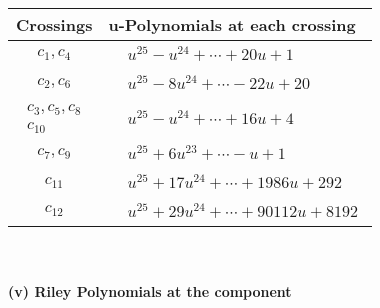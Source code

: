 \documentclass[1p]{elsarticle_modified}
\theoremstyle{definition}
\begin{document}
\begin{tabular}{m{50pt}|m{274pt}}
Crossings & \hspace{64pt}u-Polynomials at each crossing \\
\hline $$\begin{aligned}c_{1},c_{4}\end{aligned}$$&$\begin{aligned}
&u^{25}- u^{24}+\cdots+20 u+1
\end{aligned}$\\
\hline $$\begin{aligned}c_{2},c_{6}\end{aligned}$$&$\begin{aligned}
&u^{25}-8 u^{24}+\cdots-22 u+20
\end{aligned}$\\
\hline $$\begin{aligned}c_{3},c_{5},c_{8}\\c_{10}\end{aligned}$$&$\begin{aligned}
&u^{25}- u^{24}+\cdots+16 u+4
\end{aligned}$\\
\hline $$\begin{aligned}c_{7},c_{9}\end{aligned}$$&$\begin{aligned}
&u^{25}+6 u^{23}+\cdots- u+1
\end{aligned}$\\
\hline $$\begin{aligned}c_{11}\end{aligned}$$&$\begin{aligned}
&u^{25}+17 u^{24}+\cdots+1986 u+292
\end{aligned}$\\
\hline $$\begin{aligned}c_{12}\end{aligned}$$&$\begin{aligned}
&u^{25}+29 u^{24}+\cdots+90112 u+8192
\end{aligned}$\\
\hline
\end{tabular}\\~\\
\newpage\renewcommand{\arraystretch}{1}
\flushleft \textbf{(v) Riley Polynomials at the component}\newline \\
\end{document}

